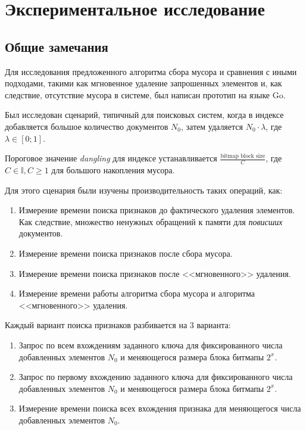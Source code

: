 \newpage
\section{Экспериментальное исследование}

\subsection{Общие замечания}

Для исследования предложенного алгоритма сбора мусора и сравнения с иными
подходами, такими как мгновенное удаление запрошенных элементов и, как следствие, отсутствие
мусора в системе, был написан прототип на языке Go.

Был исследован сценарий, типичный для поисковых систем, когда в индексе добавляется большое
количество документов $N_0$, затем удаляется $N_0\cdot \lambda$, где $\lambda \in [0; 1]$.

Пороговое значение \textit{dangling} для индексе устанавливается
$\frac{\text{bitmap block size}}{C}$, где $C \in \mathbb{I}, C \geq 1$ для
большого накопления мусора.

Для этого сценария были изучены производительность таких операций, как:
\begin{enumerate}
    \item Измерение времени поиска признаков до фактического удаления элементов.
    Как следствие, множество ненужных обращений к памяти для \textit{повисших}
    документов.
    \item Измерение времени поиска признаков после сбора мусора.
    \item Измерение времени поиска признаков после <<мгновенного>> удаления.
    \item Измерение времени работы алгоритма сбора мусора и алгоритма <<мгновенного>> удаления.
\end{enumerate}

Каждый вариант поиска признаков разбивается на 3 варианта:
\begin{enumerate}
      \item Запрос по всем вхождениям заданного ключа для фиксированного числа
      добавленных элементов $N_0$ и меняющегося размера блока битмапы $2^{x}$.
      \item Запрос по первому вхождению заданного ключа для фиксированного числа
      добавленных элементов $N_0$ и меняющегося размера блока битмапы $2^{x}$.
      \item Измерение времени поиска всех вхождения признака для меняющегося числа добавленных элементов $N_0$.
\end{enumerate}

